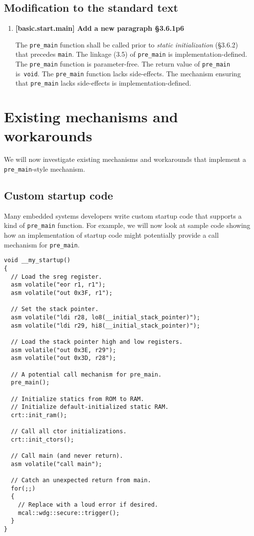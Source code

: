 \documentclass[11pt]{article}
\begin{document}
\subsection*{Modification to the standard text}
\begin{enumerate}

  \item \textbf{[basic.start.main] Add a new paragraph \S3.6.1p6}

  The \lstinline{pre_main} function shall be called prior to
  \emph{static} \emph{initialization} (\S3.6.2)
  that precedes \lstinline{main}.
  The linkage (3.5) of \lstinline{pre_main} is implementation-defined.
  The \lstinline{pre_main} function is parameter-free.
  The return value of \lstinline{pre_main} is~\lstinline{void}.
  The \lstinline{pre_main} function lacks side-effects.
  The mechanism ensuring that \lstinline{pre_main} lacks
  side-effects is implementation-defined.

\end{enumerate}

\section{Existing mechanisms and workarounds}

We will now investigate existing mechanisms and
workarounds that implement a \lstinline{pre_main}-style
mechanism.

\subsection*{Custom startup code}

Many embedded systems developers write custom startup
code that supports a kind of \lstinline{pre_main} function.
For example, we will now look at sample code showing how
an implementation of startup code might potentially provide
a call mechanism for \lstinline{pre_main}.
  
\begin{lstlisting}
void __my_startup()
{
  // Load the sreg register.
  asm volatile("eor r1, r1");
  asm volatile("out 0x3F, r1");

  // Set the stack pointer.
  asm volatile("ldi r28, lo8(__initial_stack_pointer)");
  asm volatile("ldi r29, hi8(__initial_stack_pointer)");

  // Load the stack pointer high and low registers.
  asm volatile("out 0x3E, r29");
  asm volatile("out 0x3D, r28");

  // A potential call mechanism for pre_main.
  pre_main();

  // Initialize statics from ROM to RAM.
  // Initialize default-initialized static RAM.
  crt::init_ram();

  // Call all ctor initializations.
  crt::init_ctors();

  // Call main (and never return).
  asm volatile("call main");

  // Catch an unexpected return from main.
  for(;;)
  {
    // Replace with a loud error if desired.
    mcal::wdg::secure::trigger();
  }
}
\end{lstlisting}
  
\end{document}
